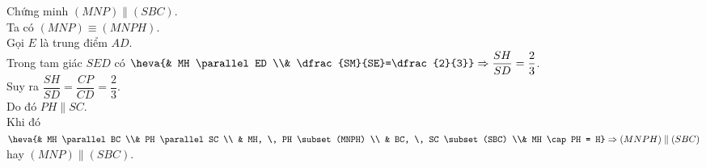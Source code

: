 \begin{bt}
{\begin{listEX}
{\begin{tikzpicture}[line join=round,line cap=round,line width=.6pt,font=\footnotesize,scale=.9]
\end{tikzpicture}}
\item Chứng minh $(MNP)\parallel (SBC)$.\\
Ta có $(MNP) \equiv (MNPH)$.\\
Gọi $E$ là trung điểm $AD$.\\
Trong tam giác $SED$ có $\heva{& MH \parallel ED \\& \dfrac{SM}{SE}=\dfrac{2}{3}} \Rightarrow \dfrac{SH}{SD}=\dfrac{2}{3}$.\\
Suy ra $\dfrac{SH}{SD}=\dfrac{CP}{CD}=\dfrac{2}{3}$.\\
Do đó $PH \parallel SC$.\\
Khi đó $\heva{& MH \parallel BC \\& PH \parallel SC \\ & MH, \, PH \subset (MNPH) \\ & BC, \, SC \subset (SBC) \\& MH \cap PH = H} \Rightarrow (MNPH) \parallel (SBC)$ hay $(MNP) \parallel (SBC)$.
\end{listEX}
}
\end{bt}


